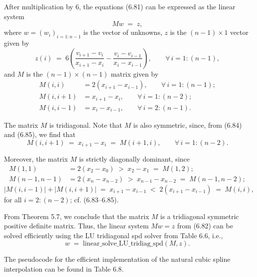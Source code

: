 After multiplication by 6, the equations (6.81) can be expressed as the linear system
\begin{equation}
Mw \;=\; z,
\end{equation}
where $w = (w_i)_{i=1:n-1}$ is the vector of unknowns, $z$ is the $(n-1) \times 1$
vector given by
\[
z(i) \;=\; 6\left(\frac{v_{i+1}-v_i}{x_{i+1}-x_i} - \frac{v_i-v_{i-1}}{x_i-x_{i-1}}\right),
\qquad \forall\, i = 1:(n-1),
\]
and $M$ is the $(n-1) \times (n-1)$ matrix given by
\begin{align}
M(i,i) &= 2(x_{i+1}-x_{i-1}), \qquad \forall\, i = 1:(n-1); \\
M(i,i+1) &= x_{i+1}-x_i, \qquad \forall\, i = 1:(n-2); \\
M(i,i-1) &= x_i - x_{i-1}, \qquad \forall\, i = 2:(n-1).
\end{align}

The matrix $M$ is tridiagonal. Note that $M$ is also symmetric, since, from (6.84) and
(6.85), we find that
\[
M(i,i+1) \;=\; x_{i+1}-x_i \;=\; M(i+1,i), \qquad \forall\, i = 1:(n-2).
\]

Moreover, the matrix $M$ is strictly diagonally dominant, since
\begin{align*}
M(1,1) &= 2(x_2-x_0) \;>\; x_2-x_1 \;=\; M(1,2); \\
M(n-1,n-1) &= 2(x_n-x_{n-2}) \;>\; x_{n-1}-x_{n-2} \;=\; M(n-1,n-2);
\end{align*}
\[
|M(i,i-1)| + |M(i,i+1)| \;=\; x_{i+1}-x_{i-1} \;<\; 2(x_{i+1}-x_{i-1}) \;=\; M(i,i),
\]
for all $i = 2:(n-2)$; cf. (6.83--6.85).

From Theorem 5.7, we conclude that the matrix $M$ is a tridiagonal symmetric positive
definite matrix. Thus, the linear system $Mw = z$ from (6.82) can be solved
efficiently using the LU tridiagonal spd solver from Table 6.6, i.e.,
\[
w \;=\; \text{linear\_solve\_LU\_tridiag\_spd}(M,z).
\]

The pseudocode for the efficient implementation of the natural cubic spline
interpolation can be found in Table 6.8.
